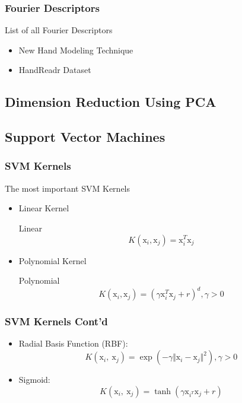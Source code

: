 \documentclass{beamer}
\begin{document}
\begin{frame}
	\frametitle{Fourier Descriptors}
	List of all Fourier Descriptors
	
	\begin{itemize}
		\item<1-> New Hand Modeling Technique
		\item<2-> HandReadr Dataset
	\end{itemize}
\end{frame}

\subsection{Dimension Reduction Using PCA}
\subsection{Support Vector Machines}

\begin{frame}
	\frametitle{SVM Kernels}
	The most important SVM Kernels
		\begin{itemize}
		\item <1-> Linear Kernel
		\begin{block}{Linear} 
		\begin{equation}
		K(\mathrm{x}_{i},\mathrm{x}_{j})=\mathrm{x}_{i}^{T}\mathrm{x}_{j}
		\end{equation}
		\end{block}		

		\item <2-> Polynomial Kernel
		\begin{block}{Polynomial} 
		\begin{equation}
		K(\mathrm{x}_{i},\mathrm{x}_{j})=(\gamma\mathrm{x}_{i}^{T}\mathrm{x}_{j}+r)^{d}, \gamma>0
		\end{equation}
		\end{block}		
 		\end{itemize}
	
\end{frame}

\begin{frame}
	\frametitle{SVM Kernels Cont'd}
	\begin{itemize}
		\item  Radial Basis Function (RBF):
		\begin{equation} 
		K(\mathrm{x}_{i},\ \mathrm{x}_{j})=\exp(-\gamma\Vert \mathrm{x}_{i}-\mathrm{x}_{j}\Vert^{2}), \gamma>0
		\end{equation}
		
		\item Sigmoid: 
		\begin{equation}
		K(\mathrm{x}_{i},\ \mathrm{x}_{j})=\tanh(\gamma \mathrm{x}_{i^{T}}\mathrm{x}_{j}+r)
		\end{equation}
	\end{itemize}

\end{frame}
\end{document}
